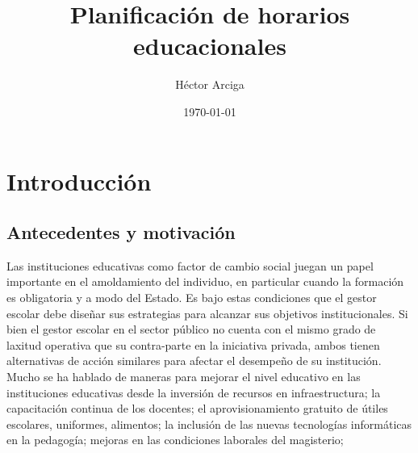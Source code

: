 \documentclass[draft,12pt,headsepline,footsepline,paper=letter]{scrreprt}
\begin{document}
\title{Planificación de horarios educacionales}
\author{Héctor Arciga}
\date{\today}

\maketitle

\begin{abstract}
 
\end{abstract}

\begin{spacing}{1}
\tableofcontents
\glsaddall 
\printglossaries
\listoffigures
\listoftables
\end{spacing}

\chapter{Introducción}

\section{Antecedentes y motivación}

Las instituciones educativas como factor de cambio social juegan un papel importante en el amoldamiento del individuo, en particular cuando la formación es obligatoria y a modo del Estado. Es bajo estas condiciones que el gestor escolar debe diseñar sus estrategias para alcanzar sus objetivos institucionales. 
Si bien el gestor escolar en el sector público no cuenta con el mismo grado de laxitud operativa que su contra-parte en la iniciativa privada, ambos tienen alternativas de acción similares para afectar el desempeño de su institución.
Mucho se ha hablado de maneras para mejorar el nivel educativo en las instituciones educativas desde la inversión de recursos en infraestructura; la capacitación continua de los docentes; el aprovisionamiento gratuito de útiles escolares, uniformes, alimentos; la  inclusión de las nuevas tecnologías informáticas en la pedagogía; mejoras en las condiciones laborales del magisterio;

\end{document}
